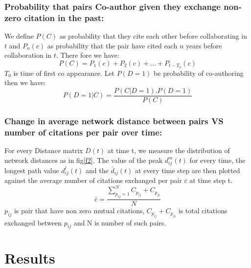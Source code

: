 \documentclass[aps, pre, twocolumn, nofootinbib]{revtex4-1}
\begin{document}
\subsubsection{Probability that pairs Co-author given they exchange non-zero citation in the past:}
We define $P(C)$ as probability that they cite each other before collaborating in  $t$ and $P_{n}(c)$ as probability that the pair have cited each $n$ years before collaboration in $t$. 
There fore we have:
\begin{equation}
P(C) = P_{1}(c) + P_{2}(c) + \dots + P_{t-T_0}(c) 
\end{equation}
$T_0$ is time of first co appearance. Let $P(D=1)$ be probability of co-authoring then we have:
\begin{equation}
P(D=1|C) = \frac{P(C|D=1).P(D=1)}{P(C)}
\end{equation}

\subsubsection{Change in average network distance between pairs VS number of citations per pair over time:}
For every Distance matrix $D(t)$ at time t, we measure the distribution of network distances as in fig\ref{f2}. The value of the peak $d^m_{ij}(t)$ for every time, the longest path value $d^l_{ij}(t)$ and the $\bar{d}_{ij}(t)$ at every time step are then plotted against the average number of citations exchanged per pair $\bar{c}$ at time step t.
\begin{equation}
\bar{c} = \frac{\sum_{p_{ij}=1}^{N} C_{p_{ij}} + C_{p_{ji}}}{N} 
\end{equation}
$p_{ij}$ is pair that have non zero mutual citations, $C_{p_{ij}} + C_{p_{ji}}$ is total citations exchanged between $p_{ij}$ and N is number of such pairs.
\section{Results}
\end{document}
